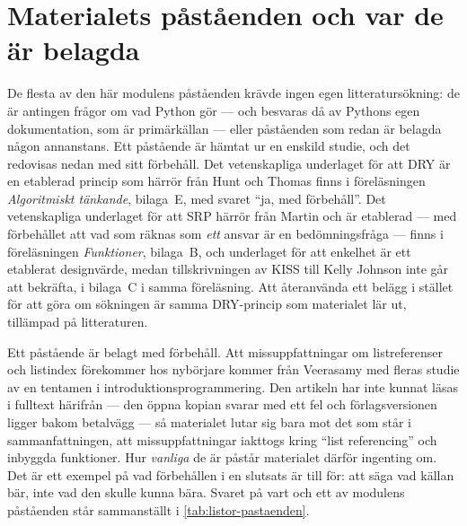 \section{Materialets påståenden och var de är belagda}
\label{sec:listor-pastaenden}

De flesta av den här modulens påståenden krävde ingen egen
litteratursökning: de är antingen frågor om vad Python gör --- och
besvaras då av Pythons egen dokumentation\autocite{PythonDataStructures},
som är primärkällan --- eller påståenden som redan är belagda någon
annanstans.  Ett påstående är hämtat ur en enskild studie, och det
redovisas nedan med sitt förbehåll.
Det vetenskapliga underlaget för att DRY är en etablerad princip som
härrör från Hunt och Thomas finns i föreläsningen \emph{Algoritmiskt
tänkande}, bilaga~E, med svaret \enquote{ja, med
förbehåll}\autocite{HuntThomas1999}.  Det vetenskapliga underlaget för
att \foreignlanguage{english}{SRP} härrör från Martin och är etablerad
--- med förbehållet att vad som räknas som \emph{ett} ansvar är en
bedömningsfråga --- finns i föreläsningen \emph{Funktioner}, bilaga~B,
och underlaget för att enkelhet är ett etablerat designvärde, medan
tillskrivningen av \foreignlanguage{english}{KISS} till Kelly Johnson
inte går att bekräfta, i bilaga~C i samma föreläsning.
Att återanvända ett belägg i
stället för att göra om sökningen är samma DRY-princip som materialet
lär ut, tillämpad på litteraturen.

Ett påstående är belagt med förbehåll.  Att missuppfattningar om
listreferenser och listindex förekommer hos nybörjare kommer från
Veerasamy med
fleras\autocite{KumarVeerasamy2016} studie av en tentamen i
introduktionsprogrammering.  Den artikeln har inte kunnat läsas i
fulltext härifrån --- den öppna kopian svarar med ett fel och
förlagsversionen ligger bakom betalvägg --- så materialet lutar sig bara
mot det som står i sammanfattningen, att missuppfattningar iakttogs
kring \enquote{list referencing} och inbyggda funktioner.  Hur
\emph{vanliga} de är påstår materialet därför ingenting om.  Det är ett
exempel på vad förbehållen i en slutsats är till för: att säga vad
källan bär, inte vad den skulle kunna bära.  Svaret på vart och ett av modulens
påståenden står sammanställt i \cref{tab:listor-pastaenden}.

